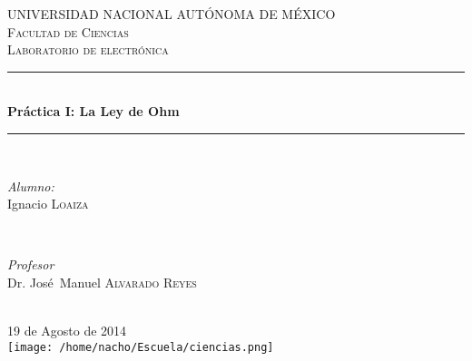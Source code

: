 \documentclass[11pt]{article}
\renewcommand{\=}[1]{\stackrel{#1}{=}} %
\theoremstyle{definition}
\theoremstyle{remark}
\begin{document}
\begin{titlepage}
\newcommand{\HRule}{\rule{\linewidth}{0.5mm}}
\center 
 
\textsc{\LARGE UNIVERSIDAD NACIONAL AUT\'ONOMA DE M\'EXICO}\\[1.5cm] 
\textsc{\Large Facultad de Ciencias}\\[0.5cm] 
\textsc{\large Laboratorio de electr\'onica}\\[0.5cm] 
\HRule \\[0.4cm]
{ \huge \bfseries Pr\'actica I: La Ley de Ohm}\\[0.4cm]
\HRule \\[1.5cm]
\begin{minipage}{0.4\textwidth}
\begin{flushleft} \large
\emph{Alumno:}\\
Ignacio \textsc{Loaiza}
\end{flushleft}
\end{minipage}
~
\begin{minipage}{0.4\textwidth}
\begin{flushright} \large
\emph{Profesor} \\
Dr. Jos\'e\ Manuel \textsc{Alvarado Reyes}
\end{flushright}
\end{minipage}\\[3cm]
{\large 19 de Agosto de 2014}\\[0.5cm]
\texttt{[image: /home/nacho/Escuela/ciencias.png]}\\[1cm]
\vfill
\end{titlepage}
\end{document}
